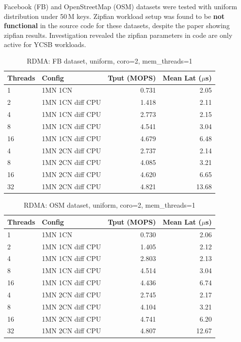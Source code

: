 \documentclass[conference]{IEEEtran}
\begin{document}
Facebook (FB) and OpenStreetMap (OSM) datasets were tested with uniform distribution under 50\,M keys. Zipfian workload setup was found to be \textbf{not functional} in the source code for these datasets, despite the paper showing zipfian results. Investigation revealed the zipfian parameters in code are only active for YCSB workloads.

\begin{table}[H]
\centering
\caption{RDMA: FB dataset, uniform, coro=2, mem\_threads=1}
\label{tab:rdma-fb}
\small
\begin{tabular}{@{}llrr@{}}
\toprule
\textbf{Threads} & \textbf{Config} & \textbf{Tput (MOPS)} & \textbf{Mean Lat ($\mu$s)} \\
\midrule
1  & 1MN 1CN             & 0.731 & 2.05 \\
2  & 1MN 1CN diff CPU    & 1.418 & 2.11 \\
4  & 1MN 1CN diff CPU    & 2.773 & 2.15 \\
8  & 1MN 1CN diff CPU    & 4.541 & 3.04 \\
16 & 1MN 1CN diff CPU    & 4.679 & 6.48 \\
\midrule
4  & 1MN 2CN diff CPU    & 2.737 & 2.14 \\
8  & 1MN 2CN diff CPU    & 4.085 & 3.21 \\
16 & 1MN 2CN diff CPU    & 4.620 & 6.65 \\
32 & 1MN 2CN diff CPU    & 4.821 & 13.68 \\
\bottomrule
\end{tabular}
\end{table}

\begin{table}[H]
\centering
\caption{RDMA: OSM dataset, uniform, coro=2, mem\_threads=1}
\label{tab:rdma-osm}
\small
\begin{tabular}{@{}llrr@{}}
\toprule
\textbf{Threads} & \textbf{Config} & \textbf{Tput (MOPS)} & \textbf{Mean Lat ($\mu$s)} \\
\midrule
1  & 1MN 1CN             & 0.730 & 2.06 \\
2  & 1MN 1CN diff CPU    & 1.405 & 2.12 \\
4  & 1MN 1CN diff CPU    & 2.803 & 2.13 \\
8  & 1MN 1CN diff CPU    & 4.514 & 3.04 \\
16 & 1MN 1CN diff CPU    & 4.436 & 6.74 \\
\midrule
4  & 1MN 2CN diff CPU    & 2.745 & 2.17 \\
8  & 1MN 2CN diff CPU    & 4.104 & 3.21 \\
16 & 1MN 2CN diff CPU    & 4.741 & 6.20 \\
32 & 1MN 2CN diff CPU    & 4.807 & 12.67 \\
\bottomrule
\end{tabular}
\end{table}
\end{document}
